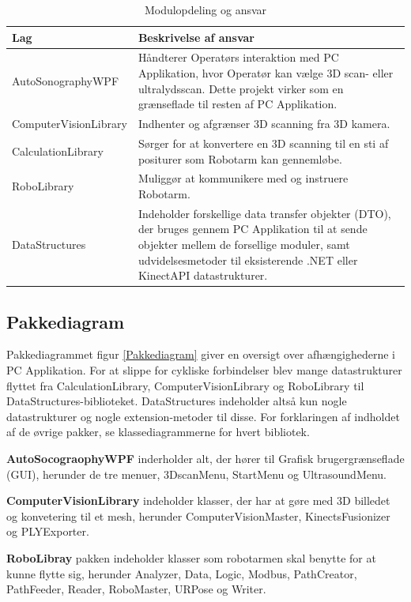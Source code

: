 \begin{table}[htb]
\begin{tabular}{ | l | p{} | }
\hline
\textbf{Lag} & \textbf{Beskrivelse af ansvar} \\\hline
AutoSonographyWPF & Håndterer Operatørs interaktion med PC Applikation, hvor Operatør kan vælge 3D scan- eller ultralydsscan. Dette projekt virker som en grænseflade til resten af PC Applikation.\\\hline
ComputerVisionLibrary & Indhenter og afgrænser 3D scanning fra 3D kamera. \\\hline
CalculationLibrary & Sørger for at konvertere en 3D scanning til en sti af positurer som Robotarm kan gennemløbe. \\\hline
RoboLibrary & Muliggør at kommunikere med og instruere Robotarm.\\\hline
DataStructures & Indeholder forskellige data transfer objekter (DTO), der bruges gennem PC Applikation til at sende objekter mellem de forsellige moduler, samt udvidelsesmetoder til eksisterende .NET eller KinectAPI datastrukturer.\\\hline
\end{tabular}
\caption{Modulopdeling og ansvar}
\end{table}

\subsection{Pakkediagram}
Pakkediagrammet figur \ref{Pakkediagram} giver en oversigt over afhængighederne i PC Applikation.
For at slippe for cykliske forbindelser blev mange datastrukturer flyttet fra CalculationLibrary, ComputerVisionLibrary og RoboLibrary til DataStructures-biblioteket.
DataStructures indeholder altså kun nogle datastrukturer og nogle extension-metoder til disse. 
For forklaringen af indholdet af de øvrige pakker, se klassediagrammerne for hvert bibliotek.

\textbf{AutoSocograophyWPF} inderholder alt, der hører til Grafisk brugergrænseflade (GUI), herunder de tre menuer, 3DscanMenu, StartMenu og UltrasoundMenu. 

\textbf{ComputerVisionLibrary} indeholder klasser, der har at gøre med 3D billedet og konvetering til et mesh, herunder ComputerVisionMaster, KinectsFusionizer og PLYExporter. 

\textbf{RoboLibray} pakken indeholder klasser som robotarmen skal benytte for at kunne flytte sig, herunder Analyzer, Data, Logic, Modbus, PathCreator, PathFeeder, Reader, RoboMaster, URPose og Writer. 

